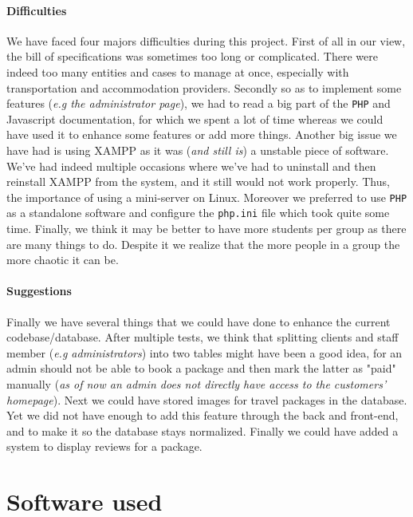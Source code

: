 \documentclass[11pt,a4paper,titlepage]{article}
\begin{document}
\paragraph{Difficulties}
We have faced four majors difficulties during this project. First of all in our view, the bill of specifications was sometimes too long or complicated. There were indeed too many entities and cases to manage at once, especially with transportation and accommodation providers. Secondly so as to implement some features (\textit{e.g the administrator page}), we had to read a big part of the \verb|PHP| and Javascript documentation, for which we spent a lot of time whereas we could have used it to enhance some features or add more things. Another big issue we have had is using XAMPP as it was (\textit{and still is}) a unstable piece of software. We've had indeed multiple occasions where we've had to uninstall and then reinstall XAMPP from the system, and it still would not work properly. Thus, the importance of using a mini-server on Linux. Moreover we preferred to use \verb|PHP| as a standalone software and configure the \verb|php.ini| file which took quite some time.
Finally, we think it may be better to have more students per group as there are many things to do. Despite it we realize that the more people in a group the more chaotic it can be. 

\paragraph{Suggestions}
Finally we have several things that we could have done to enhance the current codebase/database. After multiple tests, we think that splitting clients and staff member (\textit{e.g administrators}) into two tables might have been a good idea, for an admin should not be able to book a package and then mark the latter as "paid" manually (\textit{as of now an admin does not directly have access to the customers' homepage}). Next we could have stored images for travel packages in the database. Yet we did not have enough to add this feature through the back and front-end, and to make it so the database stays normalized. Finally we could have added a system to display reviews for a package.

\newpage
\appendix
\section{Software used}
\end{document}
